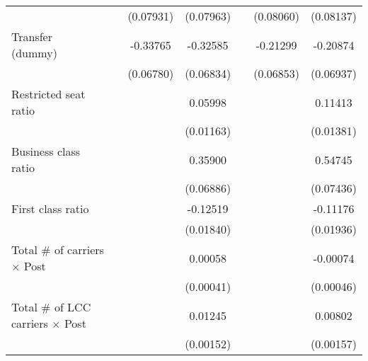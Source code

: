 \begin{table}[htbp]
\begin{tabular}{l*{6}{c}}
                    &                     &   (0.07931)         &   (0.07963)         &                     &   (0.08060)         &   (0.08137)         \\
\addlinespace
\shortstack{Transfer \\ (dummy)}&                     &    -0.33765\sym{***}&    -0.32585\sym{***}&                     &    -0.21299\sym{***}&    -0.20874\sym{***}\\
                    &                     &   (0.06780)         &   (0.06834)         &                     &   (0.06853)         &   (0.06937)         \\
\addlinespace
Restricted seat ratio&                     &                     &     0.05998\sym{***}&                     &                     &     0.11413\sym{***}\\
                    &                     &                     &   (0.01163)         &                     &                     &   (0.01381)         \\
\addlinespace
Business class ratio&                     &                     &     0.35900\sym{***}&                     &                     &     0.54745\sym{***}\\
                    &                     &                     &   (0.06886)         &                     &                     &   (0.07436)         \\
\addlinespace
First class ratio   &                     &                     &    -0.12519\sym{***}&                     &                     &    -0.11176\sym{***}\\
                    &                     &                     &   (0.01840)         &                     &                     &   (0.01936)         \\
\addlinespace
Total # of carriers $\times$ Post&                     &                     &     0.00058         &                     &                     &    -0.00074         \\
                    &                     &                     &   (0.00041)         &                     &                     &   (0.00046)         \\
\addlinespace
Total # of LCC carriers $\times$ Post&                     &                     &     0.01245\sym{***}&                     &                     &     0.00802\sym{***}\\
                    &                     &                     &   (0.00152)         &                     &                     &   (0.00157)         \\

\end{tabular}
\end{table}
